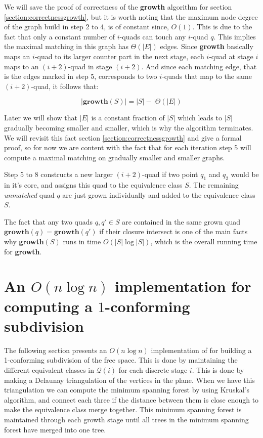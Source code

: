 We will save the proof of correctness of the \textbf{growth} algorithm for section 
\ref{section:correctnessgrowth}, but it is worth noting that the maximum node degree of the 
graph build in step 2 to 4, is of constant since, $O(1)$. This is due to the fact that only a 
constant number of $i$-quads can touch any $i$-quad $q$. This implies the maximal matching in 
this graph has $\Theta (|E|)$ edges. Since \textbf{growth} basically maps an $i$-quad to its 
larger counter part in the next stage, each $i$-quad at stage $i$ maps to an $(i+2)$-quad in 
stage $(i+2)$. And since each matching edge, that is the edges marked in step 5, corresponds 
to two $i$-quads that map to the same $(i+2)$-quad, it follows that:

$$|\mathbf{growth}(S)| = |S| - |\Theta(|E|)$$

Later we will show that $|E|$ is a constant fraction of $|S|$ which leads to $|S|$ gradually 
becoming smaller and smaller, which is why the algorithm terminates. We will revisit this fact 
section \ref{section:correctnessgrowth} and give a formal proof, so for now we are content 
with the fact that for each iteration step 5 will compute a maximal matching on gradually 
smaller and smaller graphs.  

Step 5 to 8 constructs a new larger $(i+2)$-quad if two point $q_1$ and $q_2$ would be in it's 
core, and assigns this quad to the equivalence class $S$. The remaining \textit{unmatched} 
quad $q$ are just grown individually and added to the equivalence class $S$.

The fact that any two quads $q, q' \in S$ are contained in the same grown quad $\mathbf{growth}
(q) = \mathbf{growth}(q')$ if their closure intersect is one of the main facts why 
\textbf{growth}$(S)$ runs in time $O(|S| \log |S|)$, which is the overall running time for 
\textbf{growth}.

\section{An $O(n \log n)$ implementation for computing a $1$-conforming subdivision} 
\label{section:implementationconforming}

The following section presents an $O(n \log n)$ implementation of for building a 1-conforming subdivision of the free space. This is done by maintaining the different equivalent classes in $\mathcal{Q}(i)$ for each discrete stage $i$. This is done by making a Delaunay triangulation of the vertices in the plane. When we have this triangulation we can compute the minimum spanning forest by using Kruskal's algorithm, and connect each three if the distance between them is close enough to make the equivalence class merge together. This minimum spanning forest is maintained through each growth stage until all trees in the minimum spanning forest have merged into one tree.

